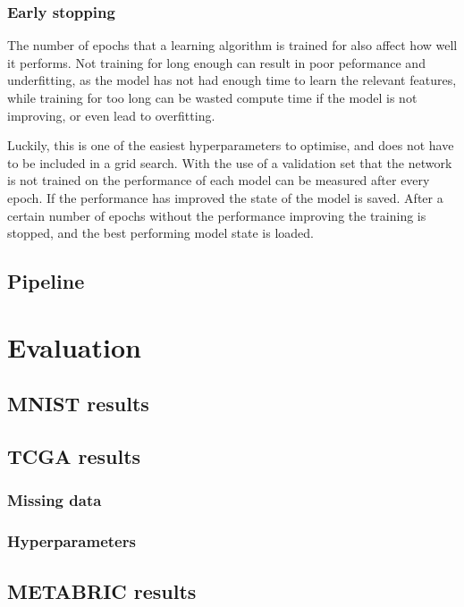 \documentclass[12pt,a4paper,twoside,openright]{report}
\begin{document}
\subsection{Early stopping}
The number of epochs that a learning algorithm is trained for also affect how well it performs. Not training for long enough can result in
poor peformance and underfitting, as the model has not had enough time to learn the relevant features, while training for too long can
be wasted compute time if the model is not improving, or even lead to overfitting.

Luckily, this is one of the easiest hyperparameters to optimise, and does not have to be included in a grid search. 
With the use of a validation set that the network is not trained on the performance of each model can be measured after every epoch. 
If the performance has improved the state of the model is saved. After a certain number of epochs without the performance improving 
the training is stopped, and the best performing model state is loaded.

\section{Pipeline}

\chapter{Evaluation}

\section{MNIST results}

\section{TCGA results}

\subsection{Missing data}

\subsection{Hyperparameters}

\section{METABRIC results}
\end{document}
